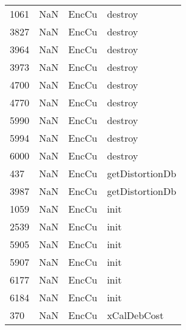 \begin{tabular}{llll}
1061 &                   NaN &                      EncCu &                                   destroy \\
3827 &                   NaN &                      EncCu &                                   destroy \\
3964 &                   NaN &                      EncCu &                                   destroy \\
3973 &                   NaN &                      EncCu &                                   destroy \\
4700 &                   NaN &                      EncCu &                                   destroy \\
4770 &                   NaN &                      EncCu &                                   destroy \\
5990 &                   NaN &                      EncCu &                                   destroy \\
5994 &                   NaN &                      EncCu &                                   destroy \\
6000 &                   NaN &                      EncCu &                                   destroy \\
437  &                   NaN &                      EncCu &                           getDistortionDb \\
3987 &                   NaN &                      EncCu &                           getDistortionDb \\
1059 &                   NaN &                      EncCu &                                      init \\
2539 &                   NaN &                      EncCu &                                      init \\
5905 &                   NaN &                      EncCu &                                      init \\
5907 &                   NaN &                      EncCu &                                      init \\
6177 &                   NaN &                      EncCu &                                      init \\
6184 &                   NaN &                      EncCu &                                      init \\
370  &                   NaN &                      EncCu &                               xCalDebCost \\

\end{tabular}
